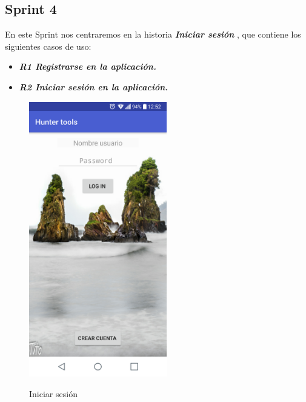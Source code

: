 \subsection{Sprint 4}

En este Sprint nos centraremos en la historia \textbf{\textit{Iniciar sesión }}, que contiene los siguientes casos de uso:



\begin{itemize}
\item\textbf{ \textit{R1  Registrarse en la aplicación.}}
\item \textbf{\textit{R2 Iniciar sesión en la aplicación. }}

\end{itemize} 
\begin{figure}[htbp]
\begin{minipage}[b]{0.5\linewidth} %
\centering
\includegraphics[width=6cm]{capturamovil/login.png}
 \label{figura1}
\caption{Iniciar sesión }


\end{minipage}
\end{figure}
